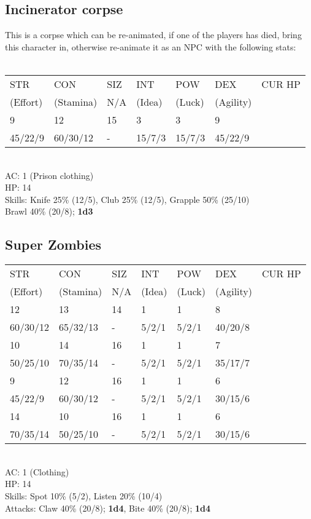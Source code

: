 \documentclass[12pt,a4paper]{article}
\begin{document}
\subsection*{Incinerator corpse}
This is a corpse which can be re-animated, if one of the players has died, bring this character in, otherwise re-animate it as an NPC with the following stats:\\\\
\begin{tabular}{| l | l | l | l | l | l |l|}
\hline
STR & CON & SIZ & INT & POW & DEX & CUR HP\\
(Effort) & (Stamina) & N/A & (Idea) & (Luck) & (Agility) & \\
\hline
9       & 12       & 15 & 3      & 3      & 9       & \\
45/22/9 & 60/30/12 & -  & 15/7/3 & 15/7/3 & 45/22/9 & \\ 
\hline
\end{tabular}
\vspace{0.2cm}
\\
AC: 1 (Prison clothing)\\
HP: 14\\
Skills: Knife 25\% (12/5), Club 25\% (12/5), Grapple 50\% (25/10)\\ Brawl 40\% (20/8); \textbf{1d3}
\newpage
\subsection*{Super Zombies}
\begin{tabular}{| l | l | l | l | l | l |l|}
\hline
STR      & CON       & SIZ & INT    & POW    & DEX       & CUR HP\\
(Effort) & (Stamina) & N/A & (Idea) & (Luck) & (Agility) & \\
\hline

12       & 13       & 14  & 1     & 1     & 8 &\\
60/30/12 & 65/32/13 & -   & 5/2/1 & 5/2/1 & 40/20/8 &\\

\rowcolor{lightgray}
10       & 14       & 16 & 1     & 1     & 7 &\\
\rowcolor{lightgray}
50/25/10 & 70/35/14 & -  & 5/2/1 & 5/2/1 & 35/17/7 &\\

9       & 12       & 16 & 1     & 1     & 6 & \\
45/22/9 & 60/30/12 & -  & 5/2/1 & 5/2/1 & 30/15/6 &\\

\rowcolor{lightgray}
14       & 10       & 16  & 1     & 1     & 6 &\\
\rowcolor{lightgray}
70/35/14 & 50/25/10 & -   & 5/2/1 & 5/2/1 & 30/15/6 &\\

\hline
\end{tabular}
\vspace{0.2cm}
\\
AC: 1 (Clothing)\\
HP: 14\\
Skills: Spot 10\% (5/2), Listen 20\% (10/4)\\
Attacks: Claw 40\% (20/8); \textbf{1d4},  Bite 40\% (20/8); \textbf{1d4}
\end{document}
